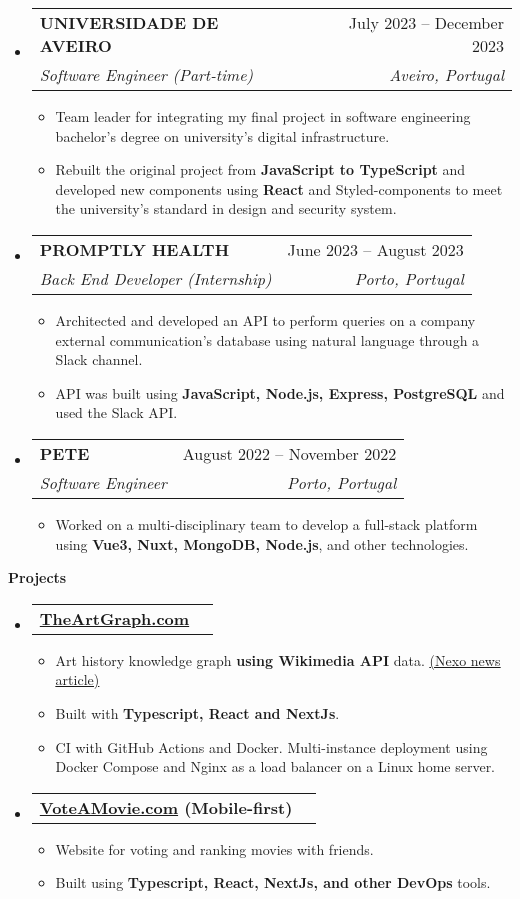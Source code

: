 \documentclass[letterpaper,12pt]{article}[leftmargin=*]
\makeatletter
\def \entryspacing {-4pt}
\renewcommand{\section}[2]{\vspace{5pt}
  \colorbox{secondary}{\color{white}\raggedbottom\normalsize\textbf{{#1}{\hspace{7pt}#2}}}
}
\newcommand{\resumeEntryStart}{\begin{itemize}[leftmargin=2.5mm]}
\newcommand{\resumeEntryEnd}{\end{itemize}\vspace{\entryspacing}}
\newcommand{\resumeItemListStart}{\begin{itemize}[leftmargin=4.5mm]}
\newcommand{\resumeItemListEnd}{\end{itemize}}
\newcommand{\resumeItem}[1]{
  \item\small{
    {#1 \vspace{-2pt}}
  }
}
\newcommand{\resumeEntryTSDL}[4]{
  \vspace{-1pt}\item[]
    \begin{tabularx}{0.97\textwidth}{X@{\hspace{60pt}}r}
      \textbf{\color{primary}#1} & {\firabook\color{accent}\small#2} \\
      \textit{\color{accent}\small#3} & \textit{\color{accent}\small#4} \\
    \end{tabularx}\vspace{-6pt}
}
\newcommand{\resumeEntryTD}[2]{
  \vspace{-1pt}\item[]
    \begin{tabularx}{0.97\textwidth}{X@{\hspace{60pt}}r}
      \textbf{\color{primary}#1} & {\firabook\color{accent}\small#2} \\
    \end{tabularx}\vspace{-6pt}
}
\makeatother
\begin{document}
  \resumeEntryStart
    \resumeEntryTSDL
      {UNIVERSIDADE DE AVEIRO}{July 2023 -- December 2023}
      {Software Engineer (Part-time)}{Aveiro, Portugal}
    \resumeItemListStart
      \resumeItem {Team leader for integrating my final project in software engineering bachelor's degree on university's digital infrastructure.}
      \resumeItem {Rebuilt the original project from \textbf{JavaScript to TypeScript} and developed new components using \textbf{React} and Styled-components to meet the university's standard in design and security system.}
    \resumeItemListEnd
  \resumeEntryEnd

  \resumeEntryStart
    \resumeEntryTSDL
      {PROMPTLY HEALTH}{June 2023 -- August 2023}
      {Back End Developer (Internship)}{Porto, Portugal}
    \resumeItemListStart
      \resumeItem {Architected and developed an API to perform queries on a company external communication's database using natural language through a Slack channel.}
      \resumeItem {API was built using \textbf{JavaScript, Node.js, Express, PostgreSQL} and used the Slack API.}
    \resumeItemListEnd
  \resumeEntryEnd

  \resumeEntryStart
    \resumeEntryTSDL
      {PETE}{August 2022 -- November 2022}
      {Software Engineer}{Porto, Portugal}
    \resumeItemListStart
      \resumeItem {Worked on a multi-disciplinary team to develop a full-stack platform using \textbf{Vue3, Nuxt, MongoDB, Node.js}, and other technologies.}
    \resumeItemListEnd
  \resumeEntryEnd
\section{\faFlask}{Projects}

  \resumeEntryStart
    \resumeEntryTD
      {\href{https://TheArtGraph.com}{TheArtGraph.com}}{}
    \resumeItemListStart
      \resumeItem {Art history knowledge graph \textbf{using Wikimedia API} data. {\underline{\href{https://www.nexojornal.com.br/expresso/2025/04/11/arte-movimentos-artisticos-grafico-site-theartgraph}{(Nexo news article)}}}}
      \resumeItem {Built with \textbf{Typescript, React and NextJs}.}
      \resumeItem {CI with GitHub Actions and Docker. Multi-instance deployment using Docker Compose and Nginx as a load balancer on a Linux home server.}
    \resumeItemListEnd
  \resumeEntryEnd

  \resumeEntryStart
    \resumeEntryTD
      {\href{https://VoteAMovie.com}{VoteAMovie.com} (Mobile-first)}{}
    \resumeItemListStart
      \resumeItem {Website for voting and ranking movies with friends.}
      \resumeItem {Built using \textbf{Typescript, React, NextJs, and other DevOps} tools.}
    \resumeItemListEnd
  \resumeEntryEnd
\end{document}
